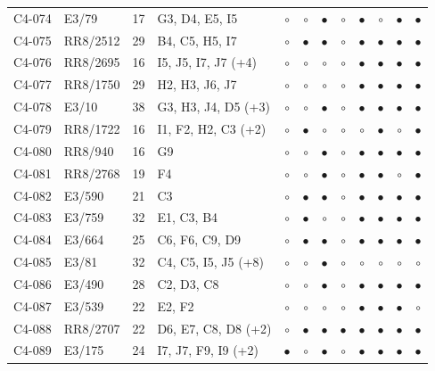 {\begin{longtable}{llrp{3.9cm}cccccccc}
    C4-074 & E3/79 & 17 & G3, D4, E5, I5 & $\circ$ & $\circ$ & $\bullet$ & $\circ$ & $\bullet$ & $\circ$ & $\bullet$ & $\bullet$ \\
    C4-075 & RR8/2512 & 29 & B4, C5, H5, I7 & $\circ$ & $\bullet$ & $\bullet$ & $\circ$ & $\bullet$ & $\bullet$ & $\bullet$ & $\bullet$ \\
    C4-076 & RR8/2695 & 16 & I5, J5, I7, J7 (+4) & $\circ$ & $\circ$ & $\circ$ & $\circ$ & $\bullet$ & $\bullet$ & $\bullet$ & $\bullet$ \\
    C4-077 & RR8/1750 & 29 & H2, H3, J6, J7 & $\circ$ & $\circ$ & $\circ$ & $\circ$ & $\bullet$ & $\bullet$ & $\bullet$ & $\bullet$ \\
    C4-078 & E3/10 & 38 & G3, H3, J4, D5 (+3) & $\circ$ & $\circ$ & $\bullet$ & $\circ$ & $\bullet$ & $\bullet$ & $\bullet$ & $\bullet$ \\
    C4-079 & RR8/1722 & 16 & I1, F2, H2, C3 (+2) & $\circ$ & $\bullet$ & $\circ$ & $\circ$ & $\circ$ & $\bullet$ & $\circ$ & $\bullet$ \\
    C4-080 & RR8/940 & 16 & G9 & $\circ$ & $\circ$ & $\bullet$ & $\circ$ & $\bullet$ & $\bullet$ & $\bullet$ & $\bullet$ \\
    C4-081 & RR8/2768 & 19 & F4 & $\circ$ & $\circ$ & $\bullet$ & $\circ$ & $\bullet$ & $\bullet$ & $\circ$ & $\bullet$ \\
    C4-082 & E3/590 & 21 & C3 & $\circ$ & $\bullet$ & $\bullet$ & $\circ$ & $\bullet$ & $\bullet$ & $\bullet$ & $\bullet$ \\
    C4-083 & E3/759 & 32 & E1, C3, B4 & $\circ$ & $\bullet$ & $\circ$ & $\circ$ & $\bullet$ & $\bullet$ & $\bullet$ & $\bullet$ \\
    C4-084 & E3/664 & 25 & C6, F6, C9, D9 & $\circ$ & $\bullet$ & $\bullet$ & $\circ$ & $\bullet$ & $\bullet$ & $\bullet$ & $\bullet$ \\
    C4-085 & E3/81 & 32 & C4, C5, I5, J5 (+8) & $\circ$ & $\circ$ & $\bullet$ & $\circ$ & $\circ$ & $\circ$ & $\circ$ & $\circ$ \\
    C4-086 & E3/490 & 28 & C2, D3, C8 & $\circ$ & $\circ$ & $\bullet$ & $\circ$ & $\bullet$ & $\bullet$ & $\bullet$ & $\bullet$ \\
    C4-087 & E3/539 & 22 & E2, F2 & $\circ$ & $\circ$ & $\circ$ & $\circ$ & $\bullet$ & $\bullet$ & $\bullet$ & $\circ$ \\
    C4-088 & RR8/2707 & 22 & D6, E7, C8, D8 (+2) & $\circ$ & $\bullet$ & $\bullet$ & $\bullet$ & $\bullet$ & $\bullet$ & $\bullet$ & $\bullet$ \\
    C4-089 & E3/175 & 24 & I7, J7, F9, I9 (+2) & $\bullet$ & $\circ$ & $\bullet$ & $\circ$ & $\bullet$ & $\bullet$ & $\bullet$ & $\bullet$ \\

\end{longtable}}
